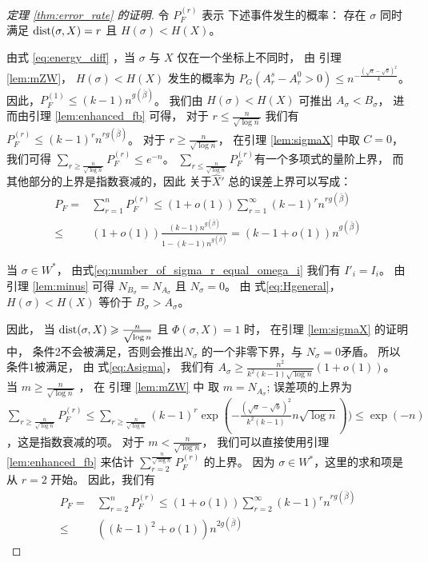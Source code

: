 \begin{proof}[定理 \ref{thm:error_rate} 的证明]

	令 $P_F^{(r)}$ 表示
  下述事件发生的概率：
  存在 $\sigma$ 同时满足
  $\operatorname{dist}(\sigma, X) = r$ 且
  $H(\sigma) < H(X)$。
	
	由式 \eqref{eq:energy_diff} ，当
  $\sigma$ 与 $X$ 仅在一个坐标上不同时，
  由 引理 \ref{lem:mZW}，
  $H(\sigma) < H(X)$ 发生的概率为
	$P_G(A_r^s - A_r^0 > 0) \leq n^{-\frac{\left(\sqrt{a} - \sqrt{b}\right)^2}{k}}$。
  因此，$P_F^{(1)}  \leq (k-1)n^{g(\bar{\beta})}$。
	我们由 $H(\sigma) < H(X)$ 可推出 $A_{\sigma} < B_{\sigma}$，
  进而由引理 \ref{lem:enhanced_fb} 
  可得，
  对于 $ r \leq \frac{n}{\sqrt{\log n}}$
  我们有
  $P_F^{(r)} \leq (k-1)^r n^{rg(\bar{\beta})}$。
	对于
  $ r \geq \frac{n}{\sqrt{\log n}}$， 在引理
 \ref{lem:sigmaX} 中取 $C=0$，我们可得
  $\sum_{r\geq \frac{n}{\sqrt{\log n}}}P_F^{(r)} \leq e^{-n}$。
	$\sum_{r\leq \frac{n}{\sqrt{\log n}}}P_F^{(r)}$有一个多项式的量阶上界，
  而其他部分的上界是指数衰减的，因此
  关于$\hat{X}'$ 总的误差上界可以写成：
  \begin{align*}
	P_F = & \sum_{r=1}^n P_F^{(r)} \leq (1+o(1)) \sum_{r=1}^{\infty} (k-1)^r n^{rg(\bar{\beta})}\\
	\leq & (1+o(1))\frac{(k-1) n^{g(\bar{\beta})}}{1-(k-1) n^{g(\bar{\beta})}} = (k-1+o(1))n^{g(\bar{\beta})}
	\end{align*}   
	
当 $\sigma \in W^*$， 由式\eqref{eq:number_of_sigma_r_equal_omega_i}
 我们有 $I'_i = I_i$。
由 引理 \ref{lem:minus} 可得
$N_{B_{\sigma}} = 
N_{A_{\sigma}}$
且 $N_{\sigma} = 0$。
由 式\eqref{eq:Hgeneral}，
$H(\sigma) < H(X)$ 等价于
$B_{\sigma} > A_{\sigma}$。

因此，
当 $ \operatorname{dist}(\sigma, X) \geqslant \frac{n}{\sqrt{\log n} }$ 且 $\Phi(\sigma, X)=1$
时，
在引理 \ref{lem:sigmaX} 的证明中，
条件2不会被满足，否则会推出$N_{\sigma}$
的一个非零下界，与  $N_{\sigma} = 0$矛盾。
所以条件1被满足，
由 式\eqref{eq:Asigma}，
我们有 $A_{\sigma} \geq \frac{n^2}{k^2(k-1)\sqrt{\log n} } (1+o(1))$。
当 $m \geq \frac{n}{ \sqrt{\log n}}$ ，
在 引理 \ref{lem:mZW}  中 取
$m=N_{A_{\sigma}}$;
误差项的上界为 $\sum_{r\geq \frac{n}{ \sqrt{\log n}}} P_F^{(r)} \leq \sum_{r\geq \frac{n}{ \sqrt{\log n}}} (k-1)^r \exp(-\frac{\left(\sqrt{a} - \sqrt{b}\right)^2}{k^2(k-1)} n \sqrt{\log n}))
\leq \exp(-n)$，这是指数衰减的项。
对于 $m < \frac{n}{ \sqrt{\log n}}$，
我们可以直接使用引理 \ref{lem:enhanced_fb}   
来估计 $\sum_{r=2}^{\frac{n}{ \sqrt{\log n}}} P_F^{(r)}$
的上界。
因为 $\sigma \in W^*$，这里的求和项是从 $r=2$ 开始。
因此，我们有
\begin{align*}
P_F = & \sum_{r=2}^n P_F^{(r)} \leq (1+o(1)) \sum_{r=2}^{\infty} (k-1)^r n^{rg(\bar{\beta})}\\
\leq & \left((k-1)^2+o(1)\right)n^{2g(\bar{\beta})}
\end{align*}
\end{proof}